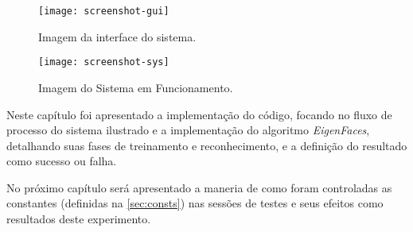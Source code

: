 \begin{figure}[h]
	\centering
	\texttt{[image: screenshot-gui]}
	\caption{Imagem da interface do sistema.}
	\label{screenshot-gui}
\end{figure}


\begin{figure}[h]
	\centering
	\texttt{[image: screenshot-sys]}
	\caption{Imagem do Sistema em Funcionamento.}
	\label{screenshot-sys}
\end{figure}



Neste capítulo foi apresentado a implementação do código, focando no fluxo de processo do sistema ilustrado e a implementação do algoritmo \textit{EigenFaces}, detalhando suas fases de treinamento e reconhecimento, e a definição do resultado como sucesso ou falha.

No próximo capítulo será apresentado a maneria de como foram controladas as constantes (definidas na \autoref{sec:consts}) nas sessões de testes e seus efeitos como resultados deste experimento.



%
